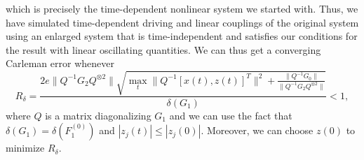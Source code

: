 \documentclass[superscriptaddress,onecolumn,nofootinbib,longbibliography,a4paper,accepted=2026-09-29]{quantumarticle}
\theoremstyle{plain}
\theoremstyle{definition}
\numberwithin{thm}{section}
\numberwithin{assumption}{section}
\numberwithin{lemma}{section}
\numberwithin{prop}{section}
\numberwithin{cor}{section}
\numberwithin{definition}{section}
\numberwithin{rmk}{section}
\numberwithin{equation}{section}
\begin{document}
which is precisely the time-dependent nonlinear system we started with. Thus, we have simulated time-dependent driving and linear couplings of the original system using an enlarged system that is time-independent and satisfies our conditions for the result with linear oscillating quantities. We can thus get a converging Carleman error whenever
\begin{equation}
        \label{eq:R_time_dep}
        R_{\delta}=  \frac{2e\|Q^{-1}G_2Q^{\otimes 2}\| \sqrt{\max_t \|Q^{-1} [x(t),z(t)]^T\|^2+\frac{\|Q^{-1} G_0\|}{\|Q^{-1}G_2Q^{\otimes 2}\|}}}{\delta(G_1)}<1,
    \end{equation}
where $Q$ is a matrix diagonalizing $G_1$ and we can use the fact that $\delta(G_1)=\delta(F_1^{(0)})$ and $|z_j(t)|\leq |z_j(0)|$. Moreover, we can choose $z(0)$ to minimize $R_\delta$.
\end{document}
